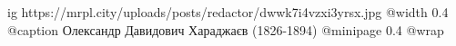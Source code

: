  
 
 
 
 

\ifcmt
  ig https://mrpl.city/uploads/posts/redactor/dwwk7i4vzxi3yrsx.jpg
  @width 0.4
	@caption Олександр Давидович Хараджаєв (1826-1894)
  @minipage 0.4
  @wrap \parpic[r]
\fi
